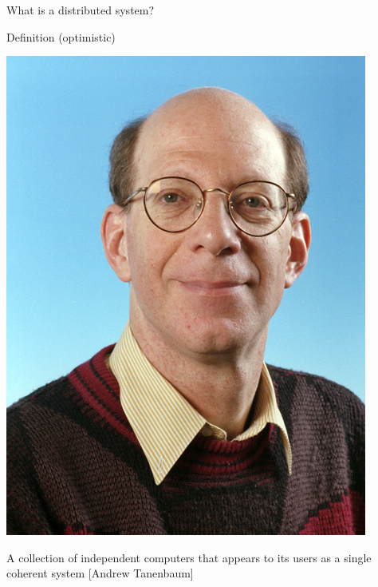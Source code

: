 \begin{frame}{What is a distributed system?}

\begin{block}{Definition (optimistic)}
\begin{minipage}{0.15\textwidth}
\includegraphics[width=\textwidth]{tanenbaum.jpg}
\end{minipage}
\hfill
\begin{minipage}{0.80\textwidth}
A collection of independent computers that appears to its users as a single coherent system [Andrew Tanenbaum]
\end{minipage}
\end{block}


\end{frame}
